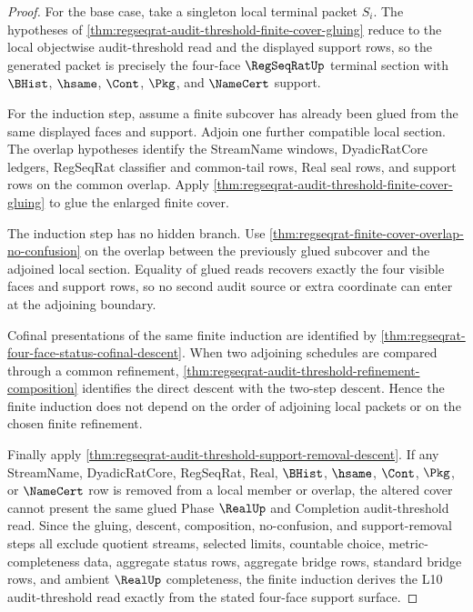 \begin{proof}
For the base case, take a singleton local terminal packet $S_i$. The hypotheses of \autoref{thm:regseqrat-audit-threshold-finite-cover-gluing} reduce to the local objectwise audit-threshold read and the displayed support rows, so the generated packet is precisely the four-face $\RegSeqRatUp$ terminal section with $\BHist$, $\hsame$, $\Cont$, $\Pkg$, and $\NameCert$ support.

For the induction step, assume a finite subcover has already been glued from the same displayed faces and support. Adjoin one further compatible local section. The overlap hypotheses identify the StreamName windows, DyadicRatCore ledgers, RegSeqRat classifier and common-tail rows, Real seal rows, and support rows on the common overlap. Apply \autoref{thm:regseqrat-audit-threshold-finite-cover-gluing} to glue the enlarged finite cover.

The induction step has no hidden branch. Use \autoref{thm:regseqrat-finite-cover-overlap-no-confusion} on the overlap between the previously glued subcover and the adjoined local section. Equality of glued reads recovers exactly the four visible faces and support rows, so no second audit source or extra coordinate can enter at the adjoining boundary.

Cofinal presentations of the same finite induction are identified by \autoref{thm:regseqrat-four-face-status-cofinal-descent}. When two adjoining schedules are compared through a common refinement, \autoref{thm:regseqrat-audit-threshold-refinement-composition} identifies the direct descent with the two-step descent. Hence the finite induction does not depend on the order of adjoining local packets or on the chosen finite refinement.

Finally apply \autoref{thm:regseqrat-audit-threshold-support-removal-descent}. If any StreamName, DyadicRatCore, RegSeqRat, Real, $\BHist$, $\hsame$, $\Cont$, $\Pkg$, or $\NameCert$ row is removed from a local member or overlap, the altered cover cannot present the same glued Phase $\RealUp$ and Completion audit-threshold read. Since the gluing, descent, composition, no-confusion, and support-removal steps all exclude quotient streams, selected limits, countable choice, metric-completeness data, aggregate status rows, aggregate bridge rows, standard bridge rows, and ambient $\RealUp$ completeness, the finite induction derives the L10 audit-threshold read exactly from the stated four-face support surface.
\end{proof}

